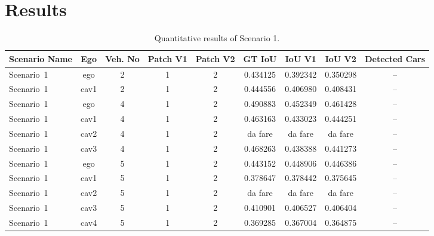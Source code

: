 \chapter{Results}
\label{results}



\begin{landscape}
\begin{table}[H]
    \centering
    \caption{Quantitative results of Scenario 1.}
    \label{tab:scenario1_results}
    \begin{tabularx}{\textwidth}{l c c c c c c c c}
        \toprule
        \textbf{Scenario Name} & 
        \textbf{Ego} &
        \textbf{Veh. No} &
        \textbf{Patch V1} &
        \textbf{Patch V2} &
        \textbf{GT IoU} & 
        \textbf{IoU V1} &
        \textbf{IoU V2} &
        \textbf{Detected Cars} \\
        \midrule %
        Scenario~1 & ego & 2 & 1 & 2 & 0.434125 & 0.392342 & 0.350298 & --  \\
        Scenario~1 & cav1 & 2 & 1 & 2 & 0.444556 & 0.406980 & 0.408431 & --  \\
        \midrule
        Scenario~1 & ego & 4 & 1 & 2 & 0.490883 & 0.452349 & 0.461428 & --  \\
        Scenario~1 & cav1 & 4 & 1 & 2 & 0.463163 & 0.433023 & 0.444251 & --  \\
        Scenario~1 & cav2 & 4 & 1 & 2 & da fare & da fare & da fare & --  \\
        Scenario~1 & cav3 & 4 & 1 & 2 & 0.468263 & 0.438388 & 0.441273 & --  \\
        \midrule
        Scenario~1 & ego & 5 & 1 & 2 & 0.443152 & 0.448906 & 0.446386 & --  \\
        Scenario~1 & cav1 & 5 & 1 & 2 & 0.378647 & 0.378442 & 0.375645 & --  \\
        Scenario~1 & cav2 & 5 & 1 & 2 & da fare & da fare & da fare & --  \\
        Scenario~1 & cav3 & 5 & 1 & 2 & 0.410901 & 0.406527 & 0.406404 & --  \\
        Scenario~1 & cav4 & 5 & 1 & 2 & 0.369285 & 0.367004 & 0.364875 & --  \\
        \bottomrule
    \end{tabularx}
\end{table}
\end{landscape}

